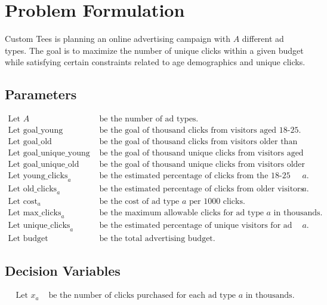 \documentclass{article}
\begin{document}
\section*{Problem Formulation}

Custom Tees is planning an online advertising campaign with \( A \) different ad types. The goal is to maximize the number of unique clicks within a given budget while satisfying certain constraints related to age demographics and unique clicks.

\subsection*{Parameters}
\begin{align*}
    \text{Let } A & \text{ be the number of ad types.} \\
    \text{Let } \text{goal\_young} & \text{ be the goal of thousand clicks from visitors aged 18-25.} \\
    \text{Let } \text{goal\_old} & \text{ be the goal of thousand clicks from visitors older than 25.} \\
    \text{Let } \text{goal\_unique\_young} & \text{ be the goal of thousand unique clicks from visitors aged 18-25.} \\
    \text{Let } \text{goal\_unique\_old} & \text{ be the goal of thousand unique clicks from visitors older than 25.} \\
    \text{Let } \text{young\_clicks}_{a} & \text{ be the estimated percentage of clicks from the 18-25 age range for ad type } a. \\
    \text{Let } \text{old\_clicks}_{a} & \text{ be the estimated percentage of clicks from older visitors for ad type } a. \\
    \text{Let } \text{cost}_{a} & \text{ be the cost of ad type } a \text{ per 1000 clicks.} \\
    \text{Let } \text{max\_clicks}_{a} & \text{ be the maximum allowable clicks for ad type } a \text{ in thousands.} \\
    \text{Let } \text{unique\_clicks}_{a} & \text{ be the estimated percentage of unique visitors for ad type } a. \\
    \text{Let } \text{budget} & \text{ be the total advertising budget.}
\end{align*}

\subsection*{Decision Variables}
\begin{align*}
    \text{Let } x_{a} & \text{ be the number of clicks purchased for each ad type } a \text{ in thousands.}
\end{align*}
\end{document}
